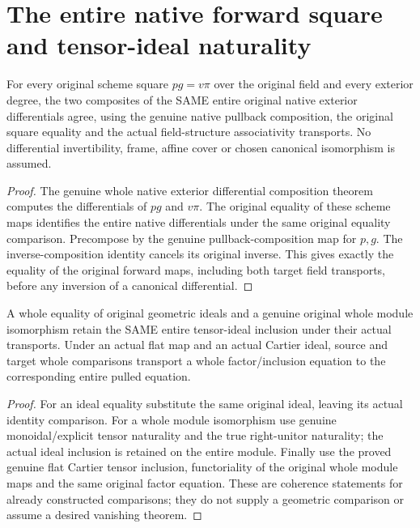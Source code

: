 \section{The entire native forward square and tensor-ideal naturality}

\begin{lemma}
\label{lem:kn-blowup-canonical-whole-forward-square}
\leanok
For every original scheme square $p g=v\pi$ over the original field
and every exterior degree, the two composites of the SAME entire original
native exterior differentials agree, using the genuine native pullback
composition, the original square equality and the actual field-structure
associativity transports. No differential invertibility, frame, affine
cover or chosen canonical isomorphism is assumed.
\end{lemma}
\begin{proof}
The genuine whole native exterior differential composition theorem computes
the differentials of $p g$ and $v\pi$. The original equality of these
scheme maps identifies the entire native differentials under the same
original equality comparison. Precompose by the genuine pullback-composition
map for $p,g$. The inverse-composition identity cancels its original
inverse. This gives exactly the equality of the original forward maps,
including both target field transports, before any inversion of a
canonical differential.
\end{proof}

\begin{lemma}
\label{lem:kn-blowup-canonical-tensor-inclusion-naturality}
\leanok
A whole equality of original geometric ideals and a genuine original
whole module isomorphism retain the SAME entire tensor-ideal inclusion
under their actual transports. Under an actual flat map and an actual
Cartier ideal, source and target whole comparisons transport a whole
factor/inclusion equation to the corresponding entire pulled equation.
\end{lemma}
\begin{proof}
For an ideal equality substitute the same original ideal, leaving its
actual identity comparison. For a whole module isomorphism use genuine
monoidal/explicit tensor naturality and the true right-unitor naturality;
the actual ideal inclusion is retained on the entire module. Finally use
the proved genuine flat Cartier tensor inclusion, functoriality of the
original whole module maps and the same original factor equation. These
are coherence statements for already constructed comparisons; they do not
supply a geometric comparison or assume a desired vanishing theorem.
\end{proof}

